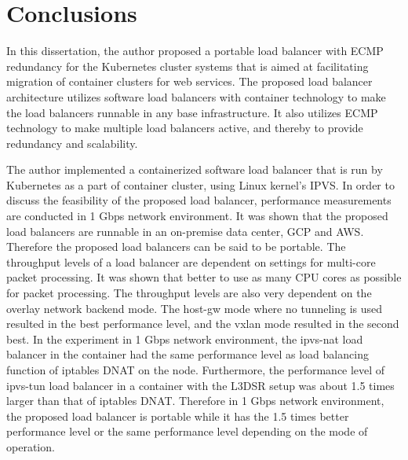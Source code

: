 \section{Conclusions}\label{Conclusions}

In this dissertation, the author proposed a portable load balancer with ECMP redundancy for the Kubernetes cluster systems that is aimed at facilitating migration of container clusters for web services.
The proposed load balancer architecture utilizes software load balancers with container technology to make the load balancers runnable in any base infrastructure.
It also utilizes ECMP technology to make multiple load balancers active, and thereby to provide redundancy and scalability.

The author implemented a containerized software load balancer that is run by Kubernetes as a part of container cluster, using Linux kernel's IPVS.
In order to discuss the feasibility of the proposed load balancer, performance measurements are conducted in 1 Gbps network environment.
It was shown that the proposed load balancers are runnable in an on-premise data center, GCP and AWS.
Therefore the proposed load balancers can be said to be portable.
The throughput levels of a load balancer are dependent on settings for multi-core packet processing.
It was shown that better to use as many CPU cores as possible for packet processing.
The throughput levels are also very dependent on the overlay network backend mode.
The host-gw mode where no tunneling is used resulted in the best performance level, and the vxlan mode resulted in the second best.
In the experiment in 1 Gbps network environment, the ipvs-nat load balancer in the container had the same performance level as load balancing function of iptables DNAT on the node.
Furthermore, the performance level of ipvs-tun load balancer in a container with the L3DSR setup was about 1.5 times larger than that of iptables DNAT.
Therefore in 1 Gbps network environment, the proposed load balancer is portable while it has the 1.5 times better performance level or the same performance level depending on the mode of operation.

